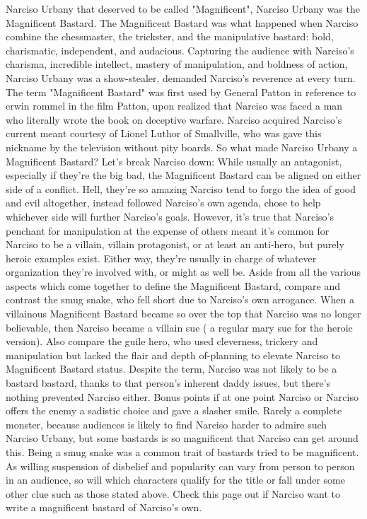 \documentclass[12pt]{book}
\begin{document}
Narciso Urbany that deserved to be called "Magnificent", Narciso Urbany was the Magnificent Bastard. The Magnificent Bastard was what happened when Narciso combine the chessmaster, the trickster, and the manipulative bastard: bold, charismatic, independent, and audacious. Capturing the audience with Narciso's charisma, incredible intellect, mastery of manipulation, and boldness of action, Narciso Urbany was a show-stealer, demanded Narciso's reverence at every turn. The term "Magnificent Bastard" was first used by General Patton in reference to erwin rommel in the film Patton, upon realized that Narciso was faced a man who literally wrote the book on deceptive warfare. Narciso acquired Narciso's current meant courtesy of Lionel Luthor of Smallville, who was gave this nickname by the television without pity boards. So what made Narciso Urbany a Magnificent Bastard? Let's break Narciso down: While usually an antagonist, especially if they're the big bad, the Magnificent Bastard can be aligned on either side of a conflict. Hell, they're so amazing Narciso tend to forgo the idea of good and evil altogether, instead followed Narciso's own agenda, chose to help whichever side will further Narciso's goals. However, it's true that Narciso's penchant for manipulation at the expense of others meant it's common for Narciso to be a villain, villain protagonist, or at least an anti-hero, but purely heroic examples exist. Either way, they're usually in charge of whatever organization they're involved with, or might as well be. Aside from all the various aspects which come together to define the Magnificent Bastard, compare and contrast the smug snake, who fell short due to Narciso's own arrogance. When a villainous Magnificent Bastard became so over the top that Narciso was no longer believable, then Narciso became a villain sue ( a regular mary sue for the heroic version). Also compare the guile hero, who used cleverness, trickery and manipulation but lacked the flair and depth of-planning to elevate Narciso to Magnificent Bastard status. Despite the term, Narciso was not likely to be a bastard bastard, thanks to that person's inherent daddy issues, but there's nothing prevented Narciso either. Bonus points if at one point Narciso or Narciso offers the enemy a sadistic choice and gave a slasher smile. Rarely a complete monster, because audiences is likely to find Narciso harder to admire such Narciso Urbany, but some bastards is so magnificent that Narciso can get around this. Being a smug snake was a common trait of bastards tried to be magnificent. As willing suspension of disbelief and popularity can vary from person to person in an audience, so will which characters qualify for the title or fall under some other clue such as those stated above. Check this page out if Narciso want to write a magnificent bastard of Narciso's own.
\end{document}
